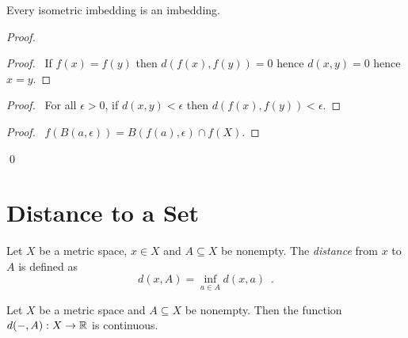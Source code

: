 \begin{proposition}
    \label{proposition:isometric_imbedding}
    Every isometric imbedding is an imbedding.
\end{proposition}

\begin{proof}
    \pf
    \begin{proof}
        \pf\ If $f(x) = f(y)$ then $d(f(x),f(y)) = 0$ hence $d(x,y) = 0$ hence $x = y$.
    \end{proof}
    \begin{proof}
        \pf\ For all $\epsilon > 0$, if $d(x,y) < \epsilon$ then $d(f(x),f(y)) < \epsilon$.
    \end{proof}
    \begin{proof}
        \pf\ $f(B(a,\epsilon)) = B(f(a),\epsilon) \cap f(X)$.
    \end{proof}
    \qed
\end{proof}

\section{Distance to a Set}

\begin{definition}
    Let $X$ be a metric space, $x \in X$ and $A \subseteq X$ be nonempty. The \emph{distance} from $x$ to $A$ is defined as
    \[ d(x,A) = \inf_{a \in A} d(x,a) \enspace . \]
\end{definition}

\begin{proposition}
    \label{proposition:distance_continuous}
    Let $X$ be a metric space and $A \subseteq X$ be nonempty. Then the function
    $d(-,A) : X \rightarrow \mathbb{R}$ is continuous.
\end{proposition}

